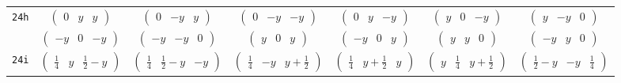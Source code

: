 \documentclass[fleqn,9pt,landscape]{jsarticle}
\begin{document}
\begin{center}
\begin{longtable}{ccccccc}
{\tt 24h} & $ \begin{pmatrix} 0 & y & y \end{pmatrix} $ & $ \begin{pmatrix} 0 & - y & y \end{pmatrix} $ & $ \begin{pmatrix} 0 & - y & - y \end{pmatrix} $ & $ \begin{pmatrix} 0 & y & - y \end{pmatrix} $ & $ \begin{pmatrix} y & 0 & - y \end{pmatrix} $ & $ \begin{pmatrix} y & - y & 0 \end{pmatrix} $ \\
& $ \begin{pmatrix} - y & 0 & - y \end{pmatrix} $ & $ \begin{pmatrix} - y & - y & 0 \end{pmatrix} $ & $ \begin{pmatrix} y & 0 & y \end{pmatrix} $ & $ \begin{pmatrix} - y & 0 & y \end{pmatrix} $ & $ \begin{pmatrix} y & y & 0 \end{pmatrix} $ & $ \begin{pmatrix} - y & y & 0 \end{pmatrix} $ \\ \hline
{\tt 24i} & $ \begin{pmatrix} \frac{1}{4} & y & \frac{1}{2} - y \end{pmatrix} $ & $ \begin{pmatrix} \frac{1}{4} & \frac{1}{2} - y & - y \end{pmatrix} $ & $ \begin{pmatrix} \frac{1}{4} & - y & y + \frac{1}{2} \end{pmatrix} $ & $ \begin{pmatrix} \frac{1}{4} & y + \frac{1}{2} & y \end{pmatrix} $ & $ \begin{pmatrix} y & \frac{1}{4} & y + \frac{1}{2} \end{pmatrix} $ & $ \begin{pmatrix} \frac{1}{2} - y & - y & \frac{1}{4} \end{pmatrix} $ \\

\end{longtable}
\end{center}
\end{document}
